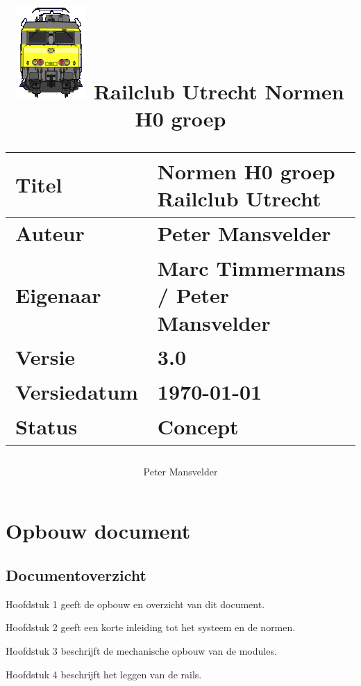 \documentclass[12pt,a4paper]{report}
\newcommand*{\myfont}{\fontfamily{lmss}\normalsize\selectfont}
\begin{document}
\myfont

\title{
\includegraphics[scale=2.0]{images/rcu_logo}
\makebox[\linewidth]{\rule{\textwidth}{0.4pt}}
Railclub Utrecht
\vfill
Normen H0 groep\\
\makebox[\linewidth]{\rule{\textwidth}{0.4pt}}
\vfill
\small
\author{Peter Mansvelder}
\begin{tabular}{| l | l |}
\hline
\cellcolor[gray]{0.84}Titel & Normen H0 groep Railclub Utrecht\\
\hline
\cellcolor[gray]{0.84}Auteur & Peter Mansvelder\\
\hline
\cellcolor[gray]{0.84}Eigenaar & Marc Timmermans / Peter Mansvelder\\
\hline
\cellcolor[gray]{0.84}Versie & 3.0\\
\hline
\cellcolor[gray]{0.84}Versiedatum & \today\\
\hline
\cellcolor[gray]{0.84}Status & Concept\\
\hline
\end{tabular}
}

\maketitle

\tableofcontents

\listoffigures

\chapter{Opbouw document}

\section{Documentoverzicht}

Hoofdstuk 1 geeft de opbouw en overzicht van dit document.

Hoofdstuk 2 geeft een korte inleiding tot het systeem en de normen.

Hoofdstuk 3 beschrijft de mechanische opbouw van de modules.

Hoofdstuk 4 beschrijft het leggen van de rails.
\end{document}
